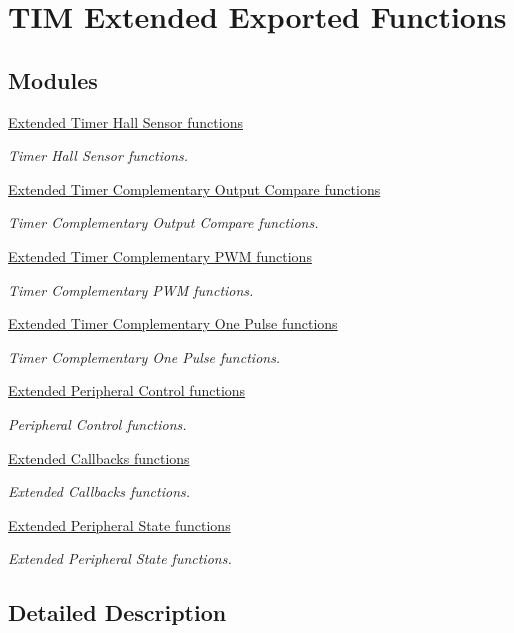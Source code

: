\hypertarget{group___t_i_m_ex___exported___functions}{}\section{T\+IM Extended Exported Functions}
\label{group___t_i_m_ex___exported___functions}
\subsection*{Modules}
\begin{DoxyCompactItemize}
\item 
\hyperlink{group___t_i_m_ex___exported___functions___group1}{Extended Timer Hall Sensor functions}
\begin{DoxyCompactList}\small\item\em Timer Hall Sensor functions. \end{DoxyCompactList}\item 
\hyperlink{group___t_i_m_ex___exported___functions___group2}{Extended Timer Complementary Output Compare functions}
\begin{DoxyCompactList}\small\item\em Timer Complementary Output Compare functions. \end{DoxyCompactList}\item 
\hyperlink{group___t_i_m_ex___exported___functions___group3}{Extended Timer Complementary P\+W\+M functions}
\begin{DoxyCompactList}\small\item\em Timer Complementary P\+WM functions. \end{DoxyCompactList}\item 
\hyperlink{group___t_i_m_ex___exported___functions___group4}{Extended Timer Complementary One Pulse functions}
\begin{DoxyCompactList}\small\item\em Timer Complementary One Pulse functions. \end{DoxyCompactList}\item 
\hyperlink{group___t_i_m_ex___exported___functions___group5}{Extended Peripheral Control functions}
\begin{DoxyCompactList}\small\item\em Peripheral Control functions. \end{DoxyCompactList}\item 
\hyperlink{group___t_i_m_ex___exported___functions___group6}{Extended Callbacks functions}
\begin{DoxyCompactList}\small\item\em Extended Callbacks functions. \end{DoxyCompactList}\item 
\hyperlink{group___t_i_m_ex___exported___functions___group7}{Extended Peripheral State functions}
\begin{DoxyCompactList}\small\item\em Extended Peripheral State functions. \end{DoxyCompactList}\end{DoxyCompactItemize}


\subsection{Detailed Description}

